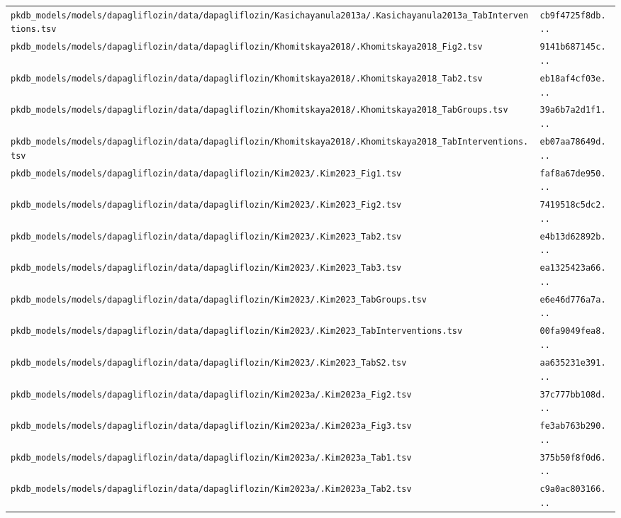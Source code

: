 \documentclass{article}
\begin{document}
\begin{longtable}{ll}
\texttt{pkdb\_models/models/dapagliflozin/data/dapagliflozin/Kasichayanula2013a/.Kasichayanula2013a\_TabInterventions.tsv} & \texttt{cb9f4725f8db...} \\
\texttt{pkdb\_models/models/dapagliflozin/data/dapagliflozin/Khomitskaya2018/.Khomitskaya2018\_Fig2.tsv} & \texttt{9141b687145c...} \\
\texttt{pkdb\_models/models/dapagliflozin/data/dapagliflozin/Khomitskaya2018/.Khomitskaya2018\_Tab2.tsv} & \texttt{eb18af4cf03e...} \\
\texttt{pkdb\_models/models/dapagliflozin/data/dapagliflozin/Khomitskaya2018/.Khomitskaya2018\_TabGroups.tsv} & \texttt{39a6b7a2d1f1...} \\
\texttt{pkdb\_models/models/dapagliflozin/data/dapagliflozin/Khomitskaya2018/.Khomitskaya2018\_TabInterventions.tsv} & \texttt{eb07aa78649d...} \\
\texttt{pkdb\_models/models/dapagliflozin/data/dapagliflozin/Kim2023/.Kim2023\_Fig1.tsv} & \texttt{faf8a67de950...} \\
\texttt{pkdb\_models/models/dapagliflozin/data/dapagliflozin/Kim2023/.Kim2023\_Fig2.tsv} & \texttt{7419518c5dc2...} \\
\texttt{pkdb\_models/models/dapagliflozin/data/dapagliflozin/Kim2023/.Kim2023\_Tab2.tsv} & \texttt{e4b13d62892b...} \\
\texttt{pkdb\_models/models/dapagliflozin/data/dapagliflozin/Kim2023/.Kim2023\_Tab3.tsv} & \texttt{ea1325423a66...} \\
\texttt{pkdb\_models/models/dapagliflozin/data/dapagliflozin/Kim2023/.Kim2023\_TabGroups.tsv} & \texttt{e6e46d776a7a...} \\
\texttt{pkdb\_models/models/dapagliflozin/data/dapagliflozin/Kim2023/.Kim2023\_TabInterventions.tsv} & \texttt{00fa9049fea8...} \\
\texttt{pkdb\_models/models/dapagliflozin/data/dapagliflozin/Kim2023/.Kim2023\_TabS2.tsv} & \texttt{aa635231e391...} \\
\texttt{pkdb\_models/models/dapagliflozin/data/dapagliflozin/Kim2023a/.Kim2023a\_Fig2.tsv} & \texttt{37c777bb108d...} \\
\texttt{pkdb\_models/models/dapagliflozin/data/dapagliflozin/Kim2023a/.Kim2023a\_Fig3.tsv} & \texttt{fe3ab763b290...} \\
\texttt{pkdb\_models/models/dapagliflozin/data/dapagliflozin/Kim2023a/.Kim2023a\_Tab1.tsv} & \texttt{375b50f8f0d6...} \\
\texttt{pkdb\_models/models/dapagliflozin/data/dapagliflozin/Kim2023a/.Kim2023a\_Tab2.tsv} & \texttt{c9a0ac803166...} \\

\end{longtable}
\end{document}
